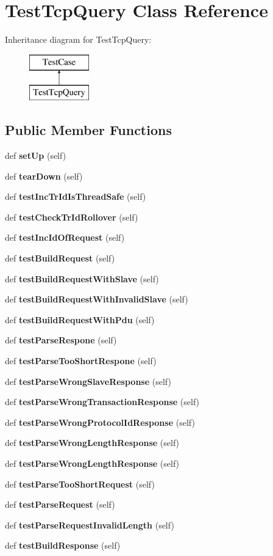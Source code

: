 \section{Test\+Tcp\+Query Class Reference}
\label{classtests_1_1unittest__modbus__tcp_1_1_test_tcp_query}
Inheritance diagram for Test\+Tcp\+Query\+:\begin{figure}[H]
\begin{center}
\leavevmode
\includegraphics[height=2.000000cm]{classtests_1_1unittest__modbus__tcp_1_1_test_tcp_query}
\end{center}
\end{figure}
\subsection*{Public Member Functions}
\begin{DoxyCompactItemize}
\item 
def {\bf set\+Up} (self)
\item 
def {\bf tear\+Down} (self)
\item 
def {\bf test\+Inc\+Tr\+Id\+Is\+Thread\+Safe} (self)
\item 
def {\bf test\+Check\+Tr\+Id\+Rollover} (self)
\item 
def {\bf test\+Inc\+Id\+Of\+Request} (self)
\item 
def {\bf test\+Build\+Request} (self)
\item 
def {\bf test\+Build\+Request\+With\+Slave} (self)
\item 
def {\bf test\+Build\+Request\+With\+Invalid\+Slave} (self)
\item 
def {\bf test\+Build\+Request\+With\+Pdu} (self)
\item 
def {\bf test\+Parse\+Respone} (self)
\item 
def {\bf test\+Parse\+Too\+Short\+Respone} (self)
\item 
def {\bf test\+Parse\+Wrong\+Slave\+Response} (self)
\item 
def {\bf test\+Parse\+Wrong\+Transaction\+Response} (self)
\item 
def {\bf test\+Parse\+Wrong\+Protocol\+Id\+Response} (self)
\item 
def {\bf test\+Parse\+Wrong\+Length\+Response} (self)
\item 
def {\bf test\+Parse\+Wrong\+Length\+Response} (self)
\item 
def {\bf test\+Parse\+Too\+Short\+Request} (self)
\item 
def {\bf test\+Parse\+Request} (self)
\item 
def {\bf test\+Parse\+Request\+Invalid\+Length} (self)
\item 
def {\bf test\+Build\+Response} (self)
\end{DoxyCompactItemize}


